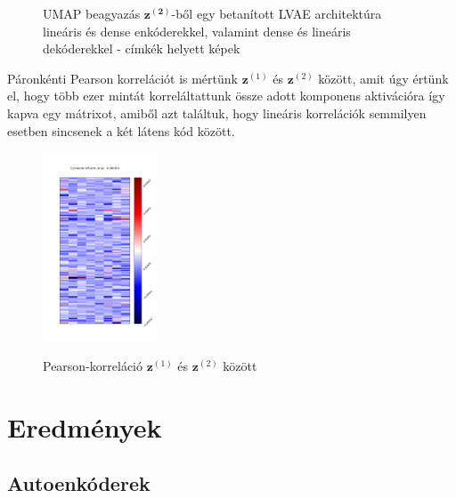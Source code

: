 \documentclass[12pt, english]{article}
\begin{document}
\begin{figure}[H]
\begin{minipage}{0.48\linewidth}
    \caption{UMAP beagyazás $\bm{z^{(2)}}$-ből egy betanított LVAE architektúra lineáris és dense enkóderekkel, valamint dense és lineáris dekóderekkel - címkék helyett képek} 
    \label{fig:umap-z2-text}
  \end{minipage} 
\end{figure}

\vspace{4mm}

\par Páronkénti Pearson korrelációt is mértünk $\bm{z}^{(1)}$ és $\bm{z}^{(2)}$ között, amit úgy értünk el, hogy több ezer mintát korreláltattunk össze adott komponens aktivációra így kapva egy mátrixot, amiből azt találtuk, hogy lineáris korrelációk semmilyen esetben sincsenek a két látens kód között.

\vspace{4mm}

\begin{figure}[H]
    \centering
    \includegraphics[width=0.3\textwidth]{z1_z2_correlation.png}
    \label{fig:pearson-matrix}
    \caption{Pearson-korreláció $\bm{z}^{(1)}$ és $\bm{z}^{(2)}$ között}
\end{figure}

\newpage

\section{Eredmények}

\vspace{7mm}

\subsection{Autoenkóderek}

\vspace{5mm}
\end{document}
